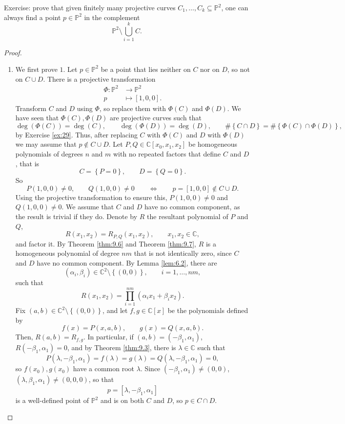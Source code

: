 \documentclass{article}
\newcommand{\C}{\mathbb{C}}
\renewcommand{\P}{\mathbb{P}}
\newcommand{\rb}[1]{\left( #1 \right)}
\renewcommand{\sb}[1]{\left[ #1 \right]}
\newcommand{\cb}[1]{\left\{ #1 \right\}}
\theoremstyle{definition}\newtheorem{definition}{Definition}[section]
\theoremstyle{definition}\newtheorem{notation}[definition]{Notation}
\theoremstyle{definition}\newtheorem{remark}[definition]{Remark}
\theoremstyle{definition}\newtheorem{example1}[definition]{Example}
\theoremstyle{definition}\newtheorem{fact}{Fact}
\theoremstyle{definition}\newtheorem{exercise}{Exercise}
\theoremstyle{definition}\newtheorem*{example2}{Example}
\begin{document}
Exercise: prove that given finitely many projective curves $ C_1, \dots, C_k \subseteq \P^2 $, one can always find a point $ p \in \P^2 $ in the complement
$$ \P^2 \setminus \bigcup_{i = 1}^k C. $$

\begin{proof}
\hfill
\begin{enumerate}
\item We first prove $ 1 $. Let $ p \in \P^2 $ be a point that lies neither on $ C $ nor on $ D $, so not on $ C \cup D $. There is a projective transformation
\begin{align*}
\Phi : \P^2 & \to \P^2 \\
p & \mapsto \sb{1, 0, 0}.
\end{align*}
Transform $ C $ and $ D $ using $ \Phi $, so replace them with $ \Phi\rb{C} $ and $ \Phi\rb{D} $. We have seen that $ \Phi\rb{C}, \Phi\rb{D} $ are projective curves such that
$$ \deg\rb{\Phi\rb{C}} = \deg\rb{C}, \qquad \deg\rb{\Phi\rb{D}} = \deg\rb{D}, \qquad \#\cb{C \cap D} = \#\cb{\Phi\rb{C} \cap \Phi\rb{D}}, $$
by Exercise \ref{ex:29}. Thus, after replacing $ C $ with $ \Phi\rb{C} $ and $ D $ with $ \Phi\rb{D} $ we may assume that $ p \notin C \cup D $. Let $ P, Q \in \C\sb{x_0, x_1, x_2} $ be homogeneous polynomials of degrees $ n $ and $ m $ with no repeated factors that define $ C $ and $ D $, that is
$$ C = \cb{P = 0}, \qquad D = \cb{Q = 0}. $$
So
$$ P\rb{1, 0, 0} \ne 0, \qquad Q\rb{1, 0, 0} \ne 0 \qquad \iff \qquad p = \sb{1, 0, 0} \notin C \cup D. $$
Using the projective transformation to ensure this, $ P\rb{1, 0, 0} \ne 0 $ and $ Q\rb{1, 0, 0} \ne 0 $. We assume that $ C $ and $ D $ have no common component, as the result is trivial if they do. Denote by $ R $ the resultant polynomial of $ P $ and $ Q $,
$$ R\rb{x_1, x_2} = R_{P, Q}\rb{x_1, x_2}, \qquad x_1, x_2 \in \C, $$
and factor it. By Theorem \ref{thm:9.6} and Theorem \ref{thm:9.7}, $ R $ is a homogeneous polynomial of degree $ nm $ that is not identically zero, since $ C $ and $ D $ have no common component. By Lemma \ref{lem:6.2}, there are
$$ \rb{\alpha_i, \beta_i} \in \C^2 \setminus \cb{\rb{0, 0}}, \qquad i = 1, \dots, nm, $$
such that
$$ R\rb{x_1, x_2} = \prod_{i = 1}^{nm} \rb{\alpha_ix_1 + \beta_ix_2}. $$
Fix $ \rb{a, b} \in \C^2 \setminus \cb{\rb{0, 0}} $, and let $ f, g \in \C\sb{x} $ be the polynomials defined by
$$ f\rb{x} = P\rb{x, a, b}, \qquad g\rb{x} = Q\rb{x, a, b}. $$
Then, $ R\rb{a, b} = R_{f, g} $. In particular, if $ \rb{a, b} = \rb{-\beta_1, \alpha_1} $, $ R\rb{-\beta_1, \alpha_1} = 0 $, and by Theorem \ref{thm:9.3}, there is $ \lambda \in \C $ such that
$$ P\rb{\lambda, -\beta_1, \alpha_1} = f\rb{\lambda} = g\rb{\lambda} = Q\rb{\lambda, -\beta_1, \alpha_1} = 0, $$
so $ f\rb{x_0}, g\rb{x_0} $ have a common root $ \lambda $. Since $ \rb{-\beta_1, \alpha_1} \ne \rb{0, 0} $, $ \rb{\lambda, \beta_1, \alpha_1} \ne \rb{0, 0, 0} $, so that
$$ p = \sb{\lambda, -\beta_1, \alpha_1} $$
is a well-defined point of $ \P^2 $ and is on both $ C $ and $ D $, so $ p \in C \cap D $.


\end{enumerate}
\end{proof}
\end{document}
